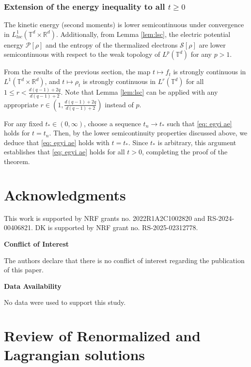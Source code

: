 \documentclass[11pt,reqno,a4paper]{amsart}
\newcommand{\R}{\mathbb{R}}
\theoremstyle{definition}
\theoremstyle{remark}
\numberwithin{equation}{section}
\newcommand{\T} {\mathbb T}
\newcommand{\calP}{\mathcal P}
\newcommand{\calS}{\mathcal S}
\begin{document}
\subsubsection{Extension of the energy inequality to all $t\ge0$}
The kinetic energy (second moments) is lower semicontinuous under convergence in $L^1_{loc}(\T^d\times\R^d)$. Additionally, from Lemma \ref{lem:lsc}, the electric potential energy $\calP[\rho]$ and the entropy of the thermalized electrons $\calS[\rho]$ are lower semicontinuous with respect to the weak topology of $L^p(\T^d)$ for any $p>1$.

From the results of the previous section, the map $t\mapsto f_t$ is strongly continuous in $L^1(\T^d\times\R^d)$, and $t\mapsto \rho_t$ is strongly continuous in $L^r(\T^d)$ for all $1\le r < \frac{d(q-1)+2q}{d(q-1)+2}$. Note that Lemma \ref{lem:lsc} can be applied with any appropriate $r \in \left(1,\frac{d(q-1)+2q}{d(q-1)+2}\right)$ instead of $p$.

For any fixed $t_*\in (0,\infty)$, choose a sequence $t_n \to t_*$ such that \eqref{eq: egyi ae} holds for $t=t_n$. Then, by the lower semicontinuity properties discussed above, we deduce that \eqref{eq: egyi ae} holds with $t=t_*$. Since $t_*$ is arbitrary, this argument establishes that \eqref{eq: egyi ae} holds for all $t>0$, completing the proof of the theorem.


%
%
%
%
%
%
%
%
%

\section*{Acknowledgments}
This work is supported by NRF grants no. 2022R1A2C1002820 and RS-2024-00406821. DK is supported by NRF grant no. RS-2025-02312778.


\bigskip
\noindent\textbf{Conflict of Interest}



The authors declare that there is no conflict of interest regarding the publication of this paper.

\bigskip
\noindent\textbf{Data Availability}

No data were used to support this study.




%
%
\appendix
\section{Review of Renormalized and Lagrangian solutions} \label{sec:pre}
\end{document}
